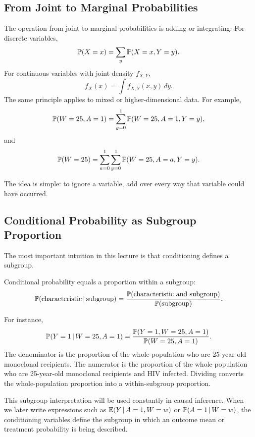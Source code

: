 \subsection{From Joint to Marginal Probabilities}

The operation from joint to marginal probabilities is adding or integrating. For discrete variables,
\[
\mathbb{P}(X=x)=\sum_y \mathbb{P}(X=x,Y=y).
\]
For continuous variables with joint density $f_{X,Y}$,
\[
f_X(x)=\int f_{X,Y}(x,y)\,dy.
\]
The same principle applies to mixed or higher-dimensional data. For example,
\[
\mathbb{P}(W=25,A=1)
=
\sum_{y=0}^1 \mathbb{P}(W=25,A=1,Y=y),
\]
and
\[
\mathbb{P}(W=25)
=
\sum_{a=0}^1\sum_{y=0}^1 \mathbb{P}(W=25,A=a,Y=y).
\]

The idea is simple: to ignore a variable, add over every way that variable could have occurred.

\subsection{Conditional Probability as Subgroup Proportion}

The most important intuition in this lecture is that conditioning defines a subgroup.

\begin{keyidea}
Conditional probability equals a proportion within a subgroup:
\[
\mathbb{P}(\text{characteristic}\,\vert\, \text{subgroup})
=
\frac{\mathbb{P}(\text{characteristic and subgroup})}
{\mathbb{P}(\text{subgroup})}.
\]
\end{keyidea}

For instance,
\[
\mathbb{P}(Y=1\,\vert\, W=25,A=1)
=
\frac{\mathbb{P}(Y=1,W=25,A=1)}{\mathbb{P}(W=25,A=1)}.
\]
The denominator is the proportion of the whole population who are 25-year-old monoclonal recipients. The numerator is the proportion of the whole population who are 25-year-old monoclonal recipients and HIV infected. Dividing converts the whole-population proportion into a within-subgroup proportion.

This subgroup interpretation will be used constantly in causal inference. When we later write expressions such as $\mathbb{E}(Y\,\vert\, A=1,W=w)$ or $\mathbb{P}(A=1\,\vert\, W=w)$, the conditioning variables define the subgroup in which an outcome mean or treatment probability is being described.
